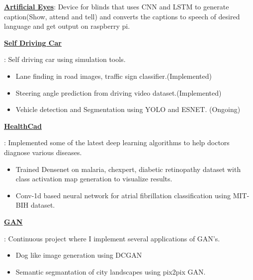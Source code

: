 \documentclass[letterpaper,10.9pt]{article}
\newcommand{\resumeItem}[2]{
  \item\small{
    \textbf{#1}{: #2 \vspace{-2pt}}
  }
}
\newcommand{\resumeSubItem}[2]{\resumeItem{#1}{#2}\vspace{-4pt}}
\begin{document}
    \resumeSubItem{\color{blue}\href{https://github.com/sanchit2843/ArtificialEyes}{Artificial Eyes}}{Device for blinds that uses CNN and LSTM to generate caption(Show, attend and tell) and converts the captions to speech of desired language and get output on raspberry pi.}
    
    \resumeSubItem{\color{blue}\href{https://github.com/sanchit2843/SelfDrivingCar}{Self Driving Car}}
      {
      Self driving car using simulation tools.
        \vspace{-5pt}
        \begin{itemize}
            \item Lane finding in road images, traffic sign classifier.(Implemented)
            \item Steering angle prediction from driving video dataset.(Implemented)
            \item Vehicle detection and Segmentation using YOLO and ESNET. (Ongoing)
        \end{itemize}
      }
      

      
    \resumeSubItem{\color{blue}\href{https://github.com/sanchit2843/healthcad}{HealthCad}}
      {Implemented some of the latest deep learning algorithms to help doctors diagnose various diseases.
        \vspace{-5pt}
        \begin{itemize}
            \item Trained Densenet on malaria, chexpert, diabetic retinopathy dataset with class activation map generation to visualize results. 
            \item Conv-1d based neural network for atrial fibrillation classification using MIT-BIH dataset. 
        \end{itemize}
      }
      
      \resumeSubItem{\color{blue}\href{https://github.com/sanchit2843/GAN-applications}{GAN}}
      {Continuous project where I implement several applications of GAN's.
        \vspace{-5pt}
        \begin{itemize}
            \item Dog like image generation using DCGAN
            \item Semantic segmantation of city landscapes using pix2pix GAN.
        \end{itemize}
      }
      
\end{document}

